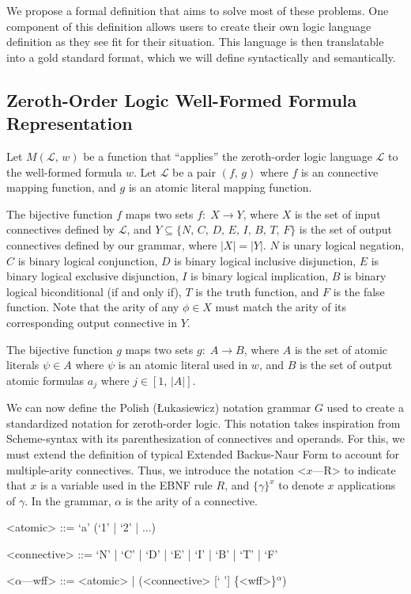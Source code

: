 \documentclass[ms]{uncgdissertationexp2}
\theoremstyle{plain}
\theoremstyle{definition}
\theoremstyle{remark}
\begin{document}
    We propose a formal definition that aims to solve most of these problems. One component of this definition allows users to create their own logic language definition as they see fit for their situation. This language is then translatable into a gold standard format, which we will define syntactically and semantically.

    \subsection{Zeroth-Order Logic Well-Formed Formula Representation}
    Let $M(\mathcal{L},\,w)$ be a function that ``applies'' the zeroth-order logic language $\mathcal{L}$ to the well-formed formula $w$. Let $\mathcal{L}$ be a pair $(f,\,g)$ where $f$ is an connective mapping function, and $g$ is an atomic literal mapping function. 

    The bijective function $f$ maps two sets $f:\;X \to Y$, where $X$ is the set of input connectives defined by $\mathcal{L}$, and $Y \subseteq \{N,\,C,\,D,\,E,\,I,\,B,\,T,\,F\}$ is the set of output connectives defined by our grammar, where $|X| = |Y|$. $N$ is unary logical negation, $C$ is binary logical conjunction, $D$ is binary logical inclusive disjunction, $E$ is binary logical exclusive disjunction, $I$ is binary logical implication, $B$ is binary logical biconditional (if and only if), $T$ is the truth function, and $F$ is the false function. Note that the arity of any $\phi \in X$ must match the arity of its corresponding output connective in $Y$.

    The bijective function $g$ maps two sets $g:\;A \to B$, where $A$ is the set of atomic literals $\psi \in A$ where $\psi$ is an atomic literal used in $w$, and $B$ is the set of output atomic formulas $a_{j}$ where $j \in [1,\,|A|]$.

    We can now define the Polish (Łukasiewicz) notation grammar $G$ used to create a standardized notation for zeroth-order logic. This notation takes inspiration from Scheme-syntax with its parenthesization of connectives and operands. For this, we must extend the definition of typical Extended Backus-Naur Form to account for multiple-arity connectives. Thus, we introduce the notation \textless{$x$---R\textgreater} to indicate that $x$ is a variable used in the EBNF rule $R$, and $\{\gamma\}^{x}$ to denote $x$ applications of $\gamma$. In the grammar, $\alpha$ is the arity of a connective.
    \begin{grammar}
        <atomic> ::= `a' (`1' | `2' | ...)
        
        <connective> ::= `N' | `C' | `D' | `E' | `I' | `B' | `T' | `F' 
        
        <$\alpha$---wff> ::= <atomic> | (<connective> [` '] \{<wff>\}$^{\alpha}$)
    \end{grammar}
\end{document}
